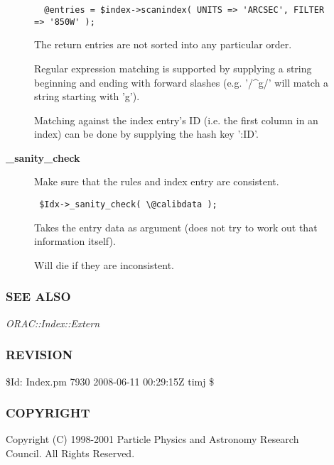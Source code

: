 \begin{description}
\begin{description}
\begin{verbatim}
  @entries = $index->scanindex( UNITS => 'ARCSEC', FILTER => '850W' );
\end{verbatim}


The return entries are not sorted into any particular order.



Regular expression matching is supported by supplying a string
beginning and ending with forward slashes (e.g. '/\^{}g/' will match a
string starting with 'g').



Matching against the index entry's ID (i.e. the first column in an
index) can be done by supplying the hash key ':ID'.


\item[{\textbf{\_sanity\_check}}] \mbox{}

Make sure that the rules and index entry are consistent.

\begin{verbatim}
 $Idx->_sanity_check( \@calibdata );
\end{verbatim}


Takes the entry data as argument (does not try to
work out that information itself).



Will die if they are inconsistent.

\end{description}
\subsubsection*{SEE ALSO\label{ORAC::Index_SEE_ALSO}}


\emph{ORAC::Index::Extern}

\subsubsection*{REVISION\label{ORAC::Index_REVISION}}


\$Id: Index.pm 7930 2008-06-11 00:29:15Z timj \$

\subsubsection*{COPYRIGHT\label{ORAC::Index_COPYRIGHT}}


Copyright (C) 1998-2001 Particle Physics and Astronomy Research
Council. All Rights Reserved.


\end{description}
